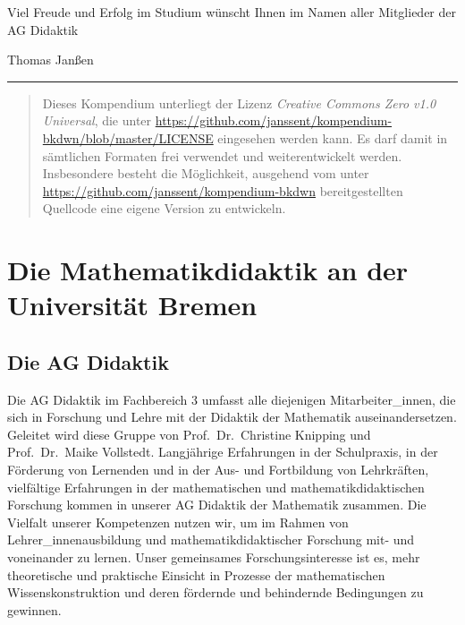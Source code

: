 \documentclass[
  bibliography=totoc,
  oneside,
  12pt,
  a4paper]{scrbook}
\begin{document}
Viel Freude und Erfolg im Studium wünscht Ihnen im Namen aller Mitglieder der AG Didaktik

Thomas Janßen

\begin{center}\rule{0.5\linewidth}{0.5pt}\end{center}

\begin{quote}
Dieses Kompendium unterliegt der Lizenz \emph{Creative Commons Zero v1.0 Universal}, die unter \url{https://github.com/janssent/kompendium-bkdwn/blob/master/LICENSE} eingesehen werden kann. Es darf damit in sämtlichen Formaten frei verwendet und weiterentwickelt werden. Insbesondere besteht die Möglichkeit, ausgehend vom unter \url{https://github.com/janssent/kompendium-bkdwn} bereitgestellten Quellcode eine eigene Version zu entwickeln.
\end{quote}

\hypertarget{die-mathematikdidaktik-an-der-universituxe4t-bremen}{%
\chapter{Die Mathematikdidaktik an der Universität Bremen}\label{die-mathematikdidaktik-an-der-universituxe4t-bremen}}

\hypertarget{die-ag-didaktik}{%
\section{Die AG Didaktik}\label{die-ag-didaktik}}

Die AG Didaktik im Fachbereich 3 umfasst alle diejenigen
Mitarbeiter\_innen, die sich in Forschung und Lehre mit der Didaktik der
Mathematik auseinandersetzen. Geleitet wird diese Gruppe von Prof.~Dr.~Christine Knipping und Prof.~Dr.~Maike Vollstedt. Langjährige Erfahrungen in der Schulpraxis, in der Förderung
von Lernenden und in der Aus- und Fortbildung von Lehrkräften,
vielfältige Erfahrungen in der mathematischen und mathematikdidaktischen
Forschung kommen in unserer AG Didaktik der Mathematik zusammen. Die
Vielfalt unserer Kompetenzen nutzen wir, um im Rahmen von
Lehrer\_innenausbildung und mathematikdidaktischer Forschung mit- und
voneinander zu lernen. Unser gemeinsames Forschungsinteresse ist es,
mehr theoretische und praktische Einsicht in Prozesse der mathematischen
Wissenskonstruktion und deren fördernde und behindernde Bedingungen zu
gewinnen.
\end{document}
